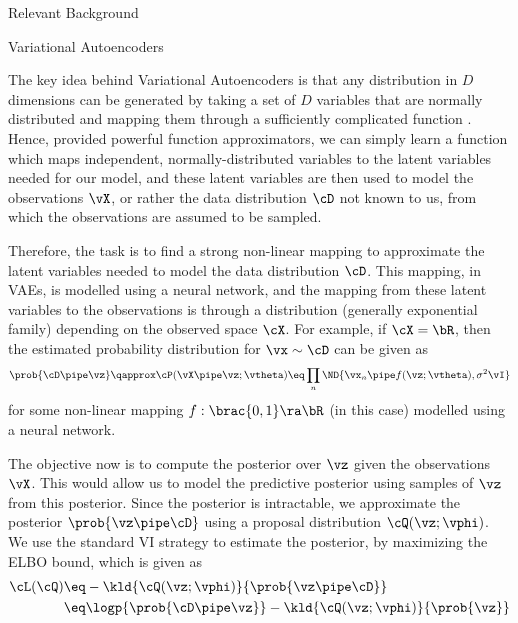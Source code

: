 \documentclass{article}
\begin{document}
\begin{psection}{Relevant Background}

	\begin{psubsection}{Variational Autoencoders}

		The key idea behind Variational Autoencoders \citep[VAEs,][]{VAE} is that any distribution in $D$ dimensions can be generated by taking a set of $D$ variables that are normally distributed and mapping them through a sufficiently complicated function \citep{vae-tut, VAE}. Hence, provided powerful function approximators, we can simply learn a function which maps independent, normally-distributed variables to the latent variables needed for our model, and these latent variables are then used to model the observations $\vX$, or rather the data distribution $\cD$ not known to us, from which the observations are assumed to be sampled.

		Therefore, the task is to find a strong non-linear mapping to approximate the latent variables needed to model the data distribution $\cD$. This mapping, in VAEs, is modelled using a neural network, and the mapping from these latent variables to the observations is through a distribution (generally exponential family) depending on the observed space $\cX$. For example, if $\cX = \bR$, then the estimated probability distribution for $\vx \sim \cD$ can be given as
		\begin{align*}
			\prob{\cD \pipe \vz} \qapprox \cP(\vX \pipe \vz; \vtheta) \eq \prod_{n} \ND{\vx_n \pipe f(\vz; \vtheta), \sigma^2 \vI}
		\end{align*}
		for some non-linear mapping $f: \brac{0, 1} \ra \bR$ (in this case) modelled using a neural network.

		The objective now is to compute the posterior over $\vz$ given the observations $\vX$. This would allow us to model the predictive posterior using samples of $\vz$ from this posterior. Since the posterior is intractable, we approximate the posterior $\prob{\vz \pipe \cD}$ using a proposal distribution $\cQ(\vz; \vphi)$. We use the standard VI strategy to estimate the posterior, by maximizing the ELBO bound, which is given as
		\begin{align*}
			\cL(\cQ) &\eq	- \kld{\cQ(\vz; \vphi)}{\prob{\vz \pipe \cD}} \\
			&\eq			\logp{\prob{\cD \pipe \vz}} - \kld{\cQ(\vz; \vphi)}{\prob{\vz}}
		\end{align*}


\end{psubsection}
\end{psection}
\end{document}
